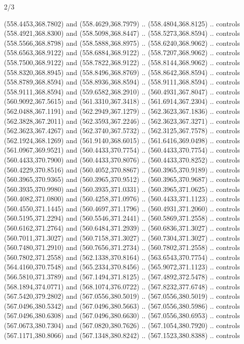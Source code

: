 \begin{flagdescription}{2/3}
\begin{scope}[xshift=0.5\flaglength,yshift=0.5\flagwidth,scale=\flagwidth/495.65]
\begin{scope}[y=0.8pt, x=0.8pt, yscale=-1,shift={(-463.76,-309.78)}]
  (558.4453,368.7802) and (558.4629,368.7979) .. (558.4804,368.8125) .. controls
  (558.4921,368.8300) and (558.5098,368.8447) .. (558.5273,368.8594) .. controls
  (558.5566,368.8798) and (558.5888,368.8975) .. (558.6240,368.9062) .. controls
  (558.6563,368.9122) and (558.6884,368.9122) .. (558.7207,368.9062) .. controls
  (558.7500,368.9122) and (558.7822,368.9122) .. (558.8144,368.9062) .. controls
  (558.8320,368.8945) and (558.8496,368.8769) .. (558.8642,368.8594) .. controls
  (558.8789,368.8594) and (558.8936,368.8594) .. (558.9111,368.8594) .. controls
  (558.9111,368.8594) and (559.6582,368.2910) .. (560.4931,367.8047) .. controls
  (560.9092,367.5615) and (561.3310,367.3418) .. (561.6914,367.2304) .. controls
  (562.0488,367.1191) and (562.2949,367.1279) .. (562.3623,367.1836) .. controls
  (562.3828,367.2011) and (562.3593,367.2246) .. (562.3623,367.3271) .. controls
  (562.3623,367.4267) and (562.3740,367.5732) .. (562.3125,367.7578) .. controls
  (562.1924,368.1269) and (561.9140,368.6015) .. (561.6416,369.0498) .. controls
  (561.0967,369.9521) and (560.4433,370.7754) .. (560.4433,370.7754) .. controls
  (560.4433,370.7900) and (560.4433,370.8076) .. (560.4433,370.8252) .. controls
  (560.4229,370.8516) and (560.4052,370.8867) .. (560.3965,370.9189) .. controls
  (560.3965,370.9365) and (560.3965,370.9512) .. (560.3965,370.9687) .. controls
  (560.3935,370.9980) and (560.3935,371.0331) .. (560.3965,371.0625) .. controls
  (560.4082,371.0800) and (560.4258,371.0976) .. (560.4433,371.1123) .. controls
  (560.4550,371.1445) and (560.4697,371.1796) .. (560.4931,371.2060) .. controls
  (560.5195,371.2294) and (560.5546,371.2441) .. (560.5869,371.2558) .. controls
  (560.6162,371.2764) and (560.6484,371.2939) .. (560.6836,371.3027) .. controls
  (560.7011,371.3027) and (560.7158,371.3027) .. (560.7304,371.3027) .. controls
  (560.7480,371.2910) and (560.7656,371.2734) .. (560.7802,371.2558) .. controls
  (560.7802,371.2558) and (562.1338,370.8164) .. (563.6543,370.7754) .. controls
  (564.4160,370.7548) and (565.2334,370.8456) .. (565.9072,371.1123) .. controls
  (566.5810,371.3789) and (567.1494,371.8125) .. (567.4892,372.5478) .. controls
  (568.1894,374.0771) and (568.1074,376.0722) .. (567.8232,377.6748) .. controls
  (567.5420,379.2802) and (567.0556,380.5019) .. (567.0556,380.5019) .. controls
  (567.0496,380.5342) and (567.0496,380.5663) .. (567.0556,380.5986) .. controls
  (567.0496,380.6308) and (567.0496,380.6630) .. (567.0556,380.6953) .. controls
  (567.0673,380.7304) and (567.0820,380.7626) .. (567.1054,380.7920) .. controls
  (567.1171,380.8066) and (567.1348,380.8242) .. (567.1523,380.8388) .. controls

\end{scope}
\end{scope}
\end{flagdescription}

